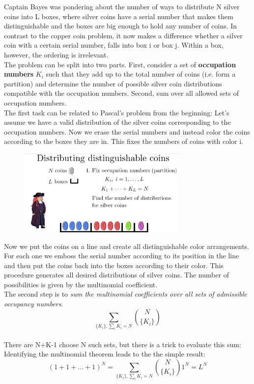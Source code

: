 \documentclass[12pt, a4paper]{scrartcl}
\begin{document}
Captain Bayes was pondering about the number of ways to distribute N silver coins into L boxes, where silver coins have a serial number that makes them distinguishable and the boxes are big enough to hold any number of coins.
In contrast to the copper coin problem, it now makes a difference whether a silver coin with a certain serial number, falls into box i or box j. Within a box, however, the ordering is irrelevant.\\
The problem can be split into two parts. 
First, consider a set of \textbf{occupation numbers} $K_i$ such that they add up to the total number of coins (i.e. form a partition) and determine the number of possible silver coin distributions compatible with the occupation numbers.
Second, sum over all allowed sets of occupation numbers.  \\
The first task can be related to Pascal's problem from the beginning:
Let's assume we have a valid distribution of the silver coins corresponding to the occupation numbers.
Now we erase the serial numbers and instead color the coins according to the boxes they are in. This fixes the numbers of coins with color i.
\begin{figure}[H]
	\centering
	\includegraphics[width=0.75\textwidth]{4_14.png}
\end{figure}
Now we put the coins on a line and create all distinguishable color arrangements. For each one we emboss the serial number according to its position in the line and then put the coins back into the boxes according to their color. This procedure generates all desired distributions of silver coins.%
The number of possibilities is given by the multinomial coefficient.\\

The second step is to \textit{sum the multinomial coefficients over all sets of admissible occupancy numbers}. 
\begin{equation*}\boxed{\sum_{\{K_i\},\sum_iK_i=N}{N\choose\{K_i\}}
}\end{equation*}\\
There are N+K-1 choose N such sets, but there is a trick to evaluate this sum:\\
Identifying the multinomial theorem leads to the the simple result: 
\begin{equation*}\boxed{(1+1+...+1)^N=\sum_{\{K_i\},\sum_iK_i=N}{N\choose\{K_i\}}1^N=L^N
}\end{equation*}\\
\end{document}
